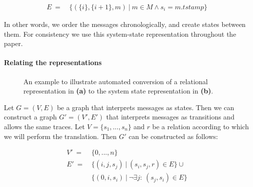 \begin{align*}
E~=~&\{(\{i\},\{i+1\},m)~|~m\in{M}\wedge{}s_i=m.tstamp\}
\end{align*}

In other words, we order the messages chronologically, and create
states between them. For consistency we use this system-state
representation throughout the paper.


\paragraph{Relating the representations}

\begin{figure}[t]
\centering
{}
\hspace{.4in}
\caption{An example to illustrate automated conversion of a relational
  representation in \textbf{(a)} to the system state representation in \textbf{(b)}.}
\label{fig:bisim_to_gktail}
\end{figure}

Let $G=(V,E)$ be a graph that interprets messages as states. Then we
can construct a graph $G'=(V',E')$ that interprets messages as
transitions and allows the same traces. Let $V=\{s_1,...,s_n\}$ and
$r$ be a relation according to which we will perform the
translation. Then $G'$ can be constructed as follows:

\begin{align*}
V'~=~	&\{0,...,n\}\\
E'~=~	&\{(i,j,s_j)~|~(s_i,s_j, r)\in{E}\}\cup\\
 	&\{(0,i,s_i)~|~\neg\exists{j}:~(s_j,s_i)\in{E}\}
\end{align*}

